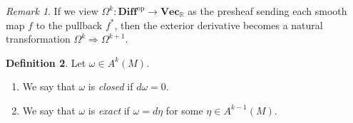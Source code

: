 \documentclass[10pt,letterpaper,cm]{nupset}
\theoremstyle{definition}
\newtheorem{definition}{Definition}[subsection]
\theoremstyle{theorem}
\theoremstyle{remark}
\newtheorem{remark}[definition]{Remark}
\newcommand{\R}{\mathbb R}
\newcommand{\1}{\mathbf{1}}
\newcommand{\0}{\vec 0}
\begin{document}
\begin{remark}
If we view $\Omega^k : \textbf{Diff}^{\text{op}} \to \textbf{Vec}_{\R}$ as the presheaf sending each smooth map $f$ to the pullback $f^{\ast}$, then the exterior derivative becomes a natural transformation $\Omega^k \Rightarrow \Omega^{k+1}$.  
\end{remark}

\begin{definition} Let $\omega \in A^k(M)$.
\begin{enumerate}
\item We say that $\omega$ is \textit{closed} if $d \omega = 0$.
\item We say that $\omega$ is \textit{exact} if $\omega = d \eta$ for some $\eta \in A^{k-1}(M)$.
\end{enumerate}
\end{definition}
\end{document}
